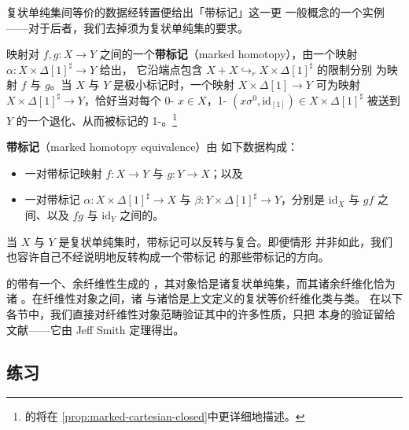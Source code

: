 复状单纯集间等价的数据经转置便给出「带标记\trHomotopyEquivalence」这一更
一般概念的一个实例——对于后者，我们去掉\trMarkedSimplicialSet{}须为复状单纯集的要求。

\begin{definition}\label{def:marked-homotopy}
映射对 $f,g\colon X\to Y$ 之间的一个\textbf{带标记\trHomotopy}（marked
homotopy），由一个映射 $\alpha\colon X\times\Delta[1]^{\sharp}\to Y$ 给出，
它沿端点包含 $X+X\hookrightarrow_{r}X\times\Delta[1]^{\sharp}$ 的限制分别
为映射 $f$ 与 $g$。当 $X$ 与 $Y$ 是极小标记\trSimplicialSet{}时，一个映射
$X\times\Delta[1]\to Y$ 可\trExtension{}为映射
$X\times\Delta[1]^{\sharp}\to Y$，恰好当对每个 0-\trSimplex{} $x\in X$，1-\trSimplex{}
$(x\sigma^{0},\mathrm{id}_{[1]})\in X\times\Delta[1]^{\sharp}$ 被送到 $Y$
的一个退化、从而被标记的 1-\trSimplex{}。\footnote{\trMarkedSimplicialSet{}的\trCartesianProduct{}将在%
\cref{prop:marked-cartesian-closed}中更详细地描述。}
\end{definition}

\textbf{带标记\trHomotopyEquivalence}（marked homotopy equivalence）由
如下数据构成：
\begin{itemize}
\item 一对带标记映射 $f\colon X\to Y$ 与 $g\colon Y\to X$；以及
\item 一对带标记\trHomotopy{} $\alpha\colon X\times\Delta[1]^{\sharp}\to X$
  与 $\beta\colon Y\times\Delta[1]^{\sharp}\to Y$，分别是 $\mathrm{id}_{X}$
  与 $gf$ 之间、以及 $fg$ 与 $\mathrm{id}_{Y}$ 之间的\trHomotopy。
\end{itemize}

当 $X$ 与 $Y$ 是复状单纯集时，带标记\trHomotopy{}可以反转与复合。即便情形
并非如此，我们也容许自己不经说明地反转构成一个带标记\trHomotopyEquivalence{}%
的那些带标记\trHomotopy{}的方向。

\begin{digression}\label{dig:verity-model-structure}
\trMarkedSimplicialSet{}的\trCategory{}带有一个\trCartesianClosed、余纤维性生成的%
\trModelStructure，其\trFibrant{}对象恰是诸复状单纯集，而其诸余纤维化恰为诸%
\trMonomorphism{} \cite[\S6.2-4]{bib129}。在纤维性对象之间，诸\trFibration{}%
与诸\trWeakEquivalence{}恰是上文定义的复状等价纤维化类与\trEquivalence{}类。
在以下各节中，我们直接对纤维性对象范畴验证其中的许多性质，只把%
\trModelStructure{}本身的验证留给文献——它由 Jeff Smith 定理得出。
\end{digression}

\subsection*{练习}

